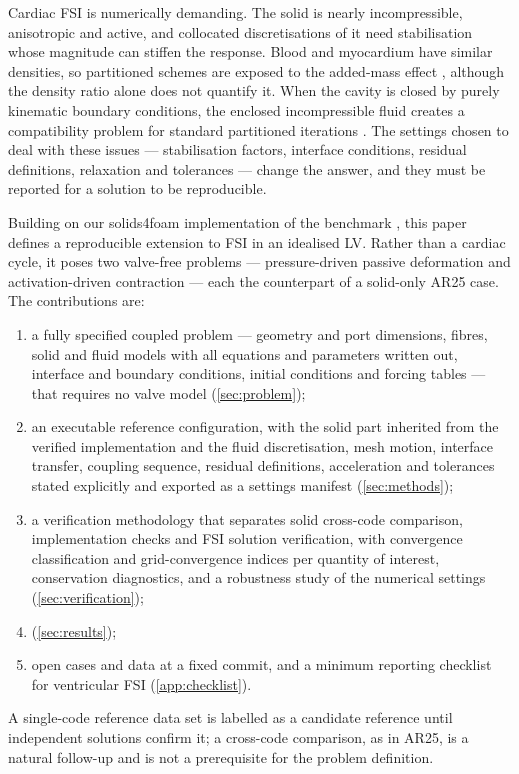 Cardiac FSI is numerically demanding. The solid is nearly incompressible,
anisotropic and active, and collocated discretisations of it need
stabilisation whose magnitude can stiffen the response. Blood and
myocardium have similar densities, so partitioned schemes are exposed to
the added-mass effect \citep{Causin2005}, although the density ratio alone
does not quantify it. When the cavity is closed by purely kinematic
boundary conditions, the enclosed incompressible fluid creates a
compatibility problem for standard partitioned iterations
\citep{Kuttler2006}. The settings chosen to deal with these issues ---
stabilisation factors, interface conditions, residual definitions,
relaxation and tolerances --- change the answer, and they must be reported
for a solution to be reproducible.

Building on our solids4foam implementation of the \citet{Arostica2025}
benchmark \citep{s4fPR571}, this paper defines a reproducible extension to
FSI in an idealised LV. Rather than a cardiac cycle, it poses two
valve-free problems --- pressure-driven passive deformation and
activation-driven contraction --- each the counterpart of a solid-only AR25
case. The contributions are:
\begin{enumerate}
\item a fully specified coupled problem --- geometry and port dimensions,
  fibres, solid and fluid models with all equations and parameters written
  out, interface and boundary conditions, initial conditions and forcing
  tables --- that requires no valve model (\cref{sec:problem});
\item an executable reference configuration, with the solid part inherited
  from the verified implementation and the fluid discretisation, mesh
  motion, interface transfer, coupling sequence, residual definitions,
  acceleration and tolerances stated explicitly and exported as a settings
  manifest (\cref{sec:methods});
\item a verification methodology that separates solid cross-code
  comparison, implementation checks and FSI solution verification, with
  convergence classification and grid-convergence indices per quantity of
  interest, conservation diagnostics, and a robustness study of the
  numerical settings (\cref{sec:verification});
\item {}
  (\cref{sec:results});
\item open cases and data at a fixed commit, and a minimum reporting
  checklist for ventricular FSI (\cref{app:checklist}).
\end{enumerate}
A single-code reference data set is labelled as a candidate reference until
independent solutions confirm it; a cross-code comparison, as in AR25, is
a natural follow-up and is not a prerequisite for the problem definition.

